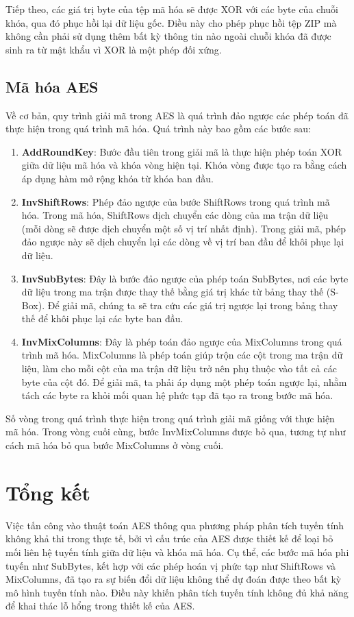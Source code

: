 \documentclass[../DoAn.tex]{subfiles}
\begin{document}
Tiếp theo, các giá trị byte của tệp mã hóa sẽ được XOR với các byte của chuỗi khóa, qua đó phục hồi lại dữ liệu gốc. Điều này cho phép phục hồi tệp ZIP mà không cần phải sử dụng thêm bất kỳ thông tin nào ngoài chuỗi khóa đã được sinh ra từ mật khẩu vì XOR là một phép đối xứng.

\subsection{Mã hóa AES}
\label{subsection:2.2.4}
Về cơ bản, quy trình giải mã trong AES là quá trình đảo ngược các phép toán đã thực hiện trong quá trình mã hóa. Quá trình này bao gồm các bước sau:

\begin{enumerate}
    \item \textbf{AddRoundKey}: Bước đầu tiên trong giải mã là thực hiện phép toán XOR giữa dữ liệu mã hóa và khóa vòng hiện tại. Khóa vòng được tạo ra bằng cách áp dụng hàm mở rộng khóa từ khóa ban đầu.
    
    \item \textbf{InvShiftRows}: Phép đảo ngược của bước ShiftRows trong quá trình mã hóa. Trong mã hóa, ShiftRows dịch chuyển các dòng của ma trận dữ liệu (mỗi dòng sẽ được dịch chuyển một số vị trí nhất định). Trong giải mã, phép đảo ngược này sẽ dịch chuyển lại các dòng về vị trí ban đầu để khôi phục lại dữ liệu.
    
    \item \textbf{InvSubBytes}: Đây là bước đảo ngược của phép toán SubBytes, nơi các byte dữ liệu trong ma trận được thay thế bằng giá trị khác từ bảng thay thế (S-Box). Để giải mã, chúng ta sẽ tra cứu các giá trị ngược lại trong bảng thay thế để khôi phục lại các byte ban đầu.
    
    \item \textbf{InvMixColumns}: Đây là phép toán đảo ngược của MixColumns trong quá trình mã hóa. MixColumns là phép toán giúp trộn các cột trong ma trận dữ liệu, làm cho mỗi cột của ma trận dữ liệu trở nên phụ thuộc vào tất cả các byte của cột đó. Để giải mã, ta phải áp dụng một phép toán ngược lại, nhằm tách các byte ra khỏi mối quan hệ phức tạp đã tạo ra trong bước mã hóa.
\end{enumerate}

Số vòng trong quá trình thực hiện trong quá trình giải mã giống với thực hiện mã hóa. Trong vòng cuối cùng, bước InvMixColumns được bỏ qua, tương tự như cách mã hóa bỏ qua bước MixColumns ở vòng cuối.

\section{Tổng kết}
\label{section:2.3}
Việc tấn công vào thuật toán AES thông qua phương pháp phân tích tuyến tính không khả thi trong thực tế, bởi vì cấu trúc của AES được thiết kế để loại bỏ mối liên hệ tuyến tính giữa dữ liệu và khóa mã hóa. Cụ thể, các bước mã hóa phi tuyến như SubBytes, kết hợp với các phép hoán vị phức tạp như ShiftRows và MixColumns, đã tạo ra sự biến đổi dữ liệu không thể dự đoán được theo bất kỳ mô hình tuyến tính nào. Điều này khiến phân tích tuyến tính không đủ khả năng để khai thác lỗ hổng trong thiết kế của AES.
\end{document}
